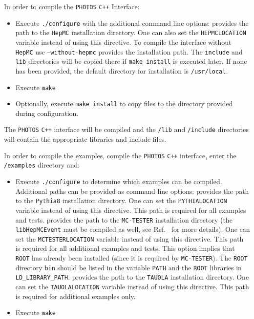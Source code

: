 \documentclass[]{Photos_interface_design}
\begin{document}
In order to compile the {\tt PHOTOS} {\tt C++} Interface:
\begin{itemize}
 \item Execute {\tt ./configure} with the additional command line options:
    provides the path to the {\tt HepMC} installation directory. One can also set the {\tt HEPMCLOCATION} variable instead of using this directive. To compile the interface without {\tt HepMC} use {\tt --without-hepmc}
    provides the installation path. The {\tt include} and {\tt lib} directories will be copied there if {\tt make install} is executed later. If none has been provided, the default directory for installation is {\tt /usr/local}.
 \item Execute {\tt make}
 \item Optionally, execute {\tt make install} to copy files to the directory provided during configuration.
\end{itemize}

The {\tt PHOTOS} {\tt C++} interface will be compiled and the {\tt /lib} and {\tt /include} directories will contain the appropriate libraries and include files.

In order to compile the examples, compile the {\tt PHOTOS} {\tt C++} interface, enter the {\tt /examples} directory and:
\begin{itemize}
  \item Execute {\tt ./configure} to determine which examples can be compiled.
        Additional paths can be provided as command line options:
    provides the path to the {\tt Pythia8} installation
            directory. One can set the {\tt PYTHIALOCATION} variable instead of using this directive.
            This path is required for all examples and tests.
    provides the path to the {\tt MC-TESTER} installation
            directory (the {\tt libHepMCEvent} must be compiled as well, see Ref.~\cite{Davidson:2008ma}
			for more details). One can set the {\tt MCTESTERLOCATION} variable instead of using this
			directive. This path is required for all additional examples and tests.  This option
			implies that {\tt ROOT} has already been installed (since it is required by {\tt MC-TESTER}).
			The {\tt ROOT} directory {\tt bin} should be listed in the variable {\tt PATH} and the {\tt ROOT}
			libraries in {\tt LD\_LIBRARY\_PATH}.
    provides the path to the {\tt TAUOLA} installation directory.
            One can set the {\tt TAUOLALOCATION} variable instead of using this directive.
			This path is required for additional examples only.
  \item Execute {\tt make}
\end{itemize}
\end{document}
